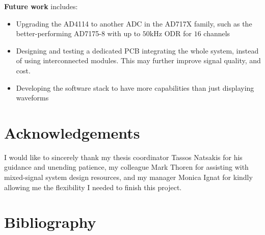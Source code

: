 \documentclass{thesis}
\newcommand{\kHz}{\unit{\kilo\hertz}}
\begin{document}
\textbf{Future work} includes:
\begin{itemize}
    \item Upgrading the AD4114 to another ADC in the AD717X family, such as the better-performing AD7175-8 with up to $50\kHz$ ODR for $16$ channels
    \item Designing and testing a dedicated PCB integrating the whole system, instead of using interconnected modules. This may further improve signal quality, and cost.
    \item Developing the software stack to have more capabilities than just displaying waveforms
\end{itemize}

\section*{Acknowledgements}

I would like to sincerely thank my thesis coordinator Tassos Natsakis for his guidance and unending patience, my colleague Mark Thoren for assisting with mixed-signal system design resources, and my manager Monica Ignat for kindly allowing me the flexibility I needed to finish this project.

\newpage
\section{Bibliography}

\printbibliography[heading=none]
\end{document}
